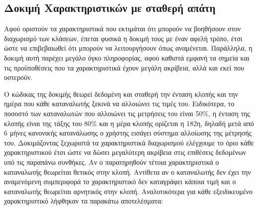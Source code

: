 \subsection{Δοκιμή Χαρακτηριστικών με σταθερή απάτη}
Αφού οριστούν τα χαρακτηριστικά που εκτιμάται ότι μπορούν να βοηθήσουν στον διαχωρισμό των κλάσεων, έπεται φυσικά η δοκιμή τους με έναν αφελή τρόπο, έτσι ώστε να επιβεβαιωθεί ότι μπορούν να λειτουργήσουν όπως αναμένεται. Παράλληλα, η δοκιμή αυτή παρέχει μεγάλο όγκο πληροφορίας, αφού καθιστά εμφανή τα σημεία και τις προϋποθέσεις που τα χαρακτηριστικά έχουν μεγάλη ακρίβεια, αλλά και εκεί που υστερούν.\par
Ο κώδικας της δοκιμής θεωρεί δεδομένη και σταθερή την ένταση κλοπής και την ημέρα που κάθε καταναλωτής ξεκινά να αλλοιώνει τις τιμές του. Ειδικότερα, το ποσοστό των καταναλωτών που αλλοιώνει τις μετρήσεις του είναι 50\%, η ένταση της κλοπής είναι της τάξης του 80\% και η μέρα κλοπής ορίζεται η 182η, δηλαδή μετά από 6 μήνες κανονικής κατανάλωσης ο χρήστης εισάγει σύστημα αλλοίωσης της μέτρησής του. Δοκιμάζοντας ξεχωριστά τα χαρακτηριστικά διαχωρισμού ελέγχουμε το όριο κάθε χαρακτηριστικού έτσι ώστε να δώσει μεγαλύτερη ακρίβεια στις επιθέσεις δεδομένων υπό τις παραπάνω συνθήκες. Αν ο παρατηρηθούν τέτοια χαρακτηριστικά ο καταναλωτής θεωρείται θετικός στην κλοπή. Αντίθετα αν ο καταναλωτής δεν έχει την αναμενόμενη συμπεριφορά το χαρακτηριστικό δεν καταγράφει κάποια τιμή και ο καταναλωτής θεωρείται αρνητικός στην κλοπή. Αναλυτικότερα για κάθε εξειδικευμένο χαρακτηριστικό λήφθηκαν τα παρακάτω αποτελέσματα:
